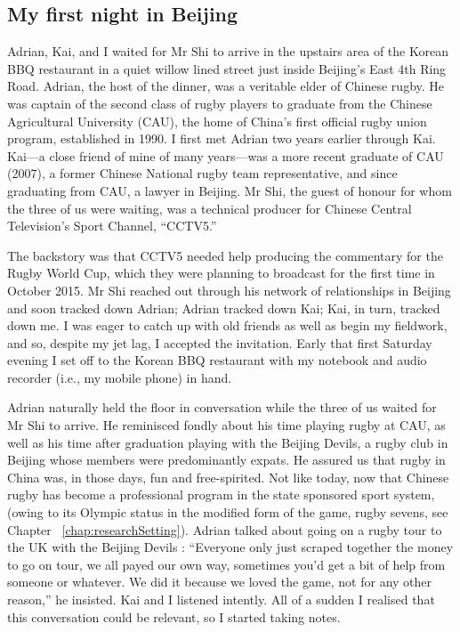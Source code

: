                                           \begin{CJK}{UTF8}{gbsn}

\section{My first night in Beijing \label{sect:adrian}}

Adrian, Kai, and I waited for Mr Shi to arrive in the upstairs area of the Korean BBQ restaurant in a quiet willow lined street just inside Beijing's East 4th Ring Road.  Adrian, the host of the dinner, was a veritable elder of Chinese rugby.  He was captain of the second class of rugby players to graduate from the Chinese Agricultural University (CAU), the home of China's first official rugby union program, established in 1990.  I first met Adrian two years earlier through Kai. Kai---a close friend of mine of many years---was a more recent graduate of CAU (2007), a former Chinese National rugby team representative, and since graduating from CAU, a lawyer in Beijing.  Mr Shi, the guest of honour for whom the three of us were waiting, was a technical producer for Chinese Central Television's Sport Channel, ``CCTV5.''

The backstory was that CCTV5 needed help producing the commentary for the Rugby World Cup, which they were planning to broadcast for the first time in October 2015.  Mr Shi reached out through his network of relationships in Beijing and soon tracked down Adrian; Adrian tracked down Kai; Kai, in turn, tracked down me.  I was eager to catch up with old friends as well as begin my fieldwork, and so, despite my jet lag, I accepted the invitation. Early that first Saturday evening I set off to the Korean BBQ restaurant with my notebook and audio recorder (i.e., my mobile phone) in hand.

Adrian naturally held the floor in conversation while the three of us waited for Mr Shi to arrive.  He reminisced fondly about his time playing rugby at CAU, as well as his time after graduation playing with the Beijing Devils, a rugby club in Beijing whose members were predominantly expats.  He assured us that rugby in China was, in those days, fun and free-spirited.  Not like today, now that Chinese rugby has become a professional program in the state sponsored sport system, (owing to its Olympic status in the modified form of the game, rugby sevens, see Chapter ~\ref{chap:researchSetting}).  Adrian talked about going on a rugby tour to the UK with the Beijing Devils :  ``Everyone only just scraped together the money to go on tour, we all payed our own way, sometimes you'd get a bit of help from someone or whatever. We did it because we loved the game, not for any other reason,'' he insisted.  Kai and I listened intently.  All of a sudden I realised that this conversation could be relevant, so I started taking notes.


\end{CJK}
